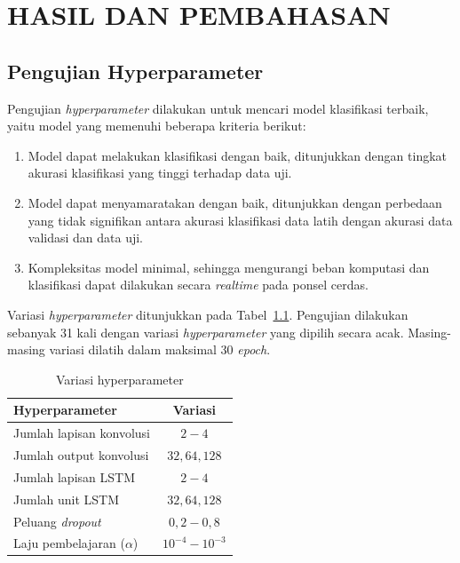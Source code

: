 \chapter{HASIL DAN PEMBAHASAN}

\section{Pengujian Hyperparameter}

Pengujian \textit{hyperparameter} dilakukan untuk mencari model klasifikasi terbaik, yaitu model yang memenuhi beberapa kriteria berikut:

\begin{enumerate}
    \item Model dapat melakukan klasifikasi dengan baik, ditunjukkan dengan tingkat akurasi klasifikasi yang tinggi terhadap data uji.
    \item Model dapat menyamaratakan dengan baik, ditunjukkan dengan perbedaan yang tidak signifikan antara akurasi klasifikasi data latih dengan akurasi data validasi dan data uji.
    \item Kompleksitas model minimal, sehingga mengurangi beban komputasi dan klasifikasi dapat dilakukan secara \textit{realtime} pada ponsel cerdas.
\end{enumerate}

Variasi \textit{hyperparameter} ditunjukkan pada Tabel~\ref{table:variasi-hyperparameter}. Pengujian dilakukan sebanyak 31 kali dengan variasi \textit{hyperparameter} yang dipilih secara acak. Masing-masing variasi dilatih dalam maksimal 30 \textit{epoch}.

\begin{table}[h!]
    \centering
    \caption{Variasi hyperparameter}
    \begin{tabular}{ |l|c| }
        \hline
        Hyperparameter & Variasi \\

        \hline
        Jumlah lapisan konvolusi & $2 - 4$ \\

        \hline
        Jumlah output konvolusi & $32, 64, 128$ \\

        \hline
        Jumlah lapisan LSTM & $2 - 4$ \\

        \hline
        Jumlah unit LSTM & $32, 64, 128$ \\

        \hline
        Peluang \textit{dropout} & $0,2 - 0,8$ \\

        \hline
        Laju pembelajaran ($\alpha$) & $10^{-4} - 10^{-3}$ \\

        \hline
    \end{tabular}
    \label{table:variasi-hyperparameter}
\end{table}

